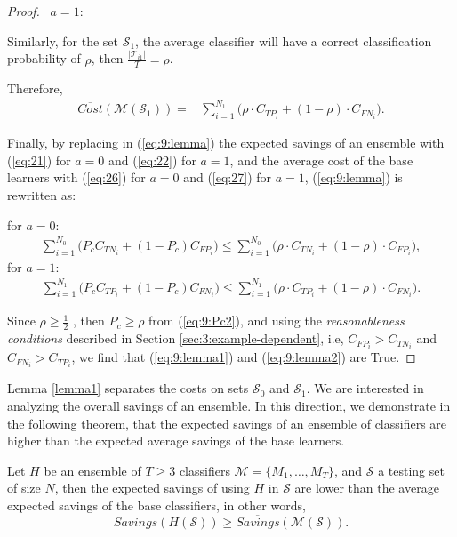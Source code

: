 {\begin{proof}
  \textbullet\ $a=1:$
 
 \noindent Similarly, for the set $\mathcal{S}_1$, the average classifier will have a correct 
  classification probability of $\rho$, then $\frac{\vert \mathcal{T}_{i1} \vert}{T}=\rho$. 
  
  \noindent Therefore,
  \begin{align}\label{eq:27}
    \overline{Cost} (\mathcal{M}(\mathcal{S}_1)) =& \sum_{i=1}^{N_1}  
    \bigg( \rho \cdot C_{TP_i} + (1-\rho) \cdot C_{FN_i}\bigg) .
  \end{align}
 
	\noindent Finally, by replacing in (\ref{eq:9:lemma}) the expected savings of an  ensemble with 
  (\ref{eq:21}) for $a=0$ and (\ref{eq:22}) for $a=1$, and the average cost of the base learners 
  with  (\ref{eq:26}) for $a=0$ and (\ref{eq:27}) for $a=1$, (\ref{eq:9:lemma}) is rewritten as:
  
  \noindent for $a=0$:
  \begin{align}\label{eq:9:lemma1}
    \sum_{i=1}^{N_0} \bigg(P_c C_{TN_i} +(1-P_c)C_{FP_i}\bigg) \le 
    \sum_{i=1}^{N_0} \bigg(\rho \cdot C_{TN_i} + (1-\rho) \cdot C_{FP_i}\bigg),
  \end{align}
  for $a=1$:
  \begin{align}\label{eq:9:lemma2}
    \sum_{i=1}^{N_1} \bigg(P_c C_{TP_i} + (1-P_c)C_{FN_i} \bigg)\le 
    \sum_{i=1}^{N_1}  \bigg(\rho \cdot C_{TP_i} + (1-\rho) \cdot C_{FN_i}\bigg).
  \end{align}
 
  \noindent Since $\rho \ge \frac{1}{2}$ , then $P_c\ge\rho$ from (\ref{eq:9:Pc2}), and using the 
  \textit{reasonableness conditions} described in Section \ref{sec:3:example-dependent}, i.e, 
  $C_{FP_i} > C_{TN_i}$ and   $C_{FN_i} > C_{TP_i}$, we find that (\ref{eq:9:lemma1}) and 
  (\ref{eq:9:lemma2}) are  True.
  \end{proof}
  
  Lemma \ref{lemma1} separates the costs on sets $\mathcal{S}_0$ and  $\mathcal{S}_1$. We are 
  interested in analyzing the overall savings of an ensemble. In this direction, we demonstrate 
  in the following theorem, that the expected savings of an ensemble of classifiers are higher 
  than the expected average savings of the base learners.
  
  \begin{theorem}\label{theorem1}
  Let $H$ be an ensemble of $T\ge3$ classifiers $\mathcal{M}=\{M_1,\dots,M_T\}$, and $\mathcal{S}$ a 
  testing set of size $ N $, then the expected savings of using $H$ in 
  $\mathcal{S}$ are lower than the average expected savings of the base classifiers, in other words,
  \begin{equation}\label{eq:9:theorem}
    Savings(H(\mathcal{S})) \ge \overline{Savings}(\mathcal{M}(\mathcal{S})). 
  \end{equation}
  \end{theorem}
  
}
